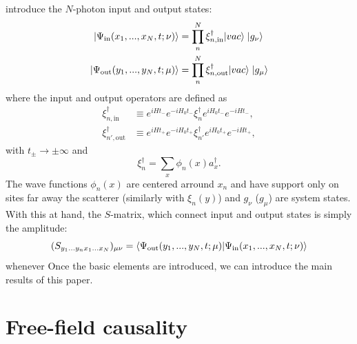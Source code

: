 \documentclass[notitlepage, prx, preprint, amsmath,superscriptaddress,amssymb]{revtex4-1}
\begin{document}
 introduce the $N$-photon  input and output states:
\begin{align}
| \Psi_{\rm in} (x_1, ..., x_N, t; \nu) \rangle &= \prod_n^N  \xi^\dagger_{n, \text{in}} |vac \rangle  \; |g_\nu \rangle
\\
| \Psi_{\rm out} (y_1, ..., y_N, t; \mu) \rangle &= \prod_{n}^N \xi^\dagger_{n, \text{out}} |vac \rangle  \; |g_\mu \rangle
\end{align} 
where the input and output operators are defined as
\begin{align}
\xi_{n,\text{in}}^\dagger & \equiv e^{iHt_-} e^{-iH_0t_-}\xi_n^\dagger e^{iH_0 t_-} e^{-iHt_-},\\
\xi_{n',\text{out}}^\dagger & \equiv e^{iHt_+} e^{-iH_0t_+}\xi_{n'}^\dagger e^{iH_0 t_+} e^{-iHt_+},
\end{align}
with $t_\pm \to\pm\infty$ and
\begin{equation}
\xi_n^\dagger = \sum_x  \phi_n(x) a_x^\dagger.
\end{equation}
The wave functions $\phi_n(x)$ are centered arround $x_n$ and  have support only on sites far away the scatterer (similarly with $\xi_n (y)$) and  $g_\nu$  ($g_\mu$) are system states.  With this at hand, the $S$-matrix, which connect input and output states is simply the amplitude:
\begin{equation}
( S_{y_1 ...y_n x_1...x_N} )_{\mu \nu} =  \langle \Psi_{\rm out} (y_1, ..., y_N, t; \mu) | \Psi_{\rm in} (x_1, ..., x_N, t; \nu) \rangle
\end{equation}
whenever 
Once the basic elements are introduced, we can introduce the main results of this paper.  


\section{Free-field causality}
\end{document}
